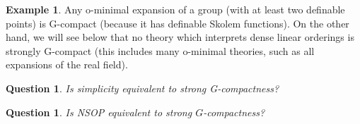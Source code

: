 \documentclass[final,a4paper,12pt]{amsart}
\newtheorem{qu}[thm]{Question}
\theoremstyle{remark}
\theoremstyle{definition}
\newtheorem{ex}[thm]{Example}
\begin{document}
	\begin{ex}
		Any o-minimal expansion of a group (with at least two definable points) is G-compact (because it has definable Skolem functions). On the other hand, we will see below that no theory which interprets dense linear orderings is strongly G-compact (this includes many o-minimal theories, such as all expansions of the real field).
	\end{ex}
	
	
	
	
	\begin{qu}
		Is simplicity equivalent to strong G-compactness?
	\end{qu}
	
	\begin{qu}
		Is NSOP equivalent to strong $G$-compactness?
	\end{qu}
	
\end{document}
